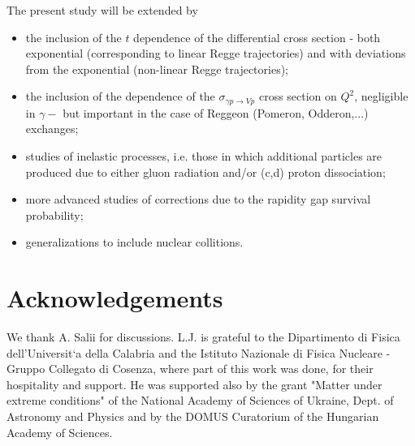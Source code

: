 \documentclass[12pt]{article}
\begin{document}
The present study will be extended by
\begin{itemize}
\item the inclusion of the $t$ dependence of the differential cross section - both exponential (corresponding to linear Regge trajectories) and with deviations from the exponential 
(non-linear Regge trajectories);
\item the inclusion of the dependence of the $\sigma_{\gamma p \rightarrow V p}$ cross section on $Q^2$, negligible in $\gamma-$ but important in the case of Reggeon (Pomeron, Odderon,...) exchanges;
\item studies of inelastic processes, i.e. those in which additional particles are produced due to either gluon radiation and/or (c,d) proton dissociation;
\item more advanced studies of corrections due to the rapidity gap survival probability;
\item generalizations to include nuclear collitions.
\end{itemize}


 \section*{Acknowledgements}
We thank A. Salii for discussions. L.J. is grateful to the Dipartimento di Fisica dell'Universit`a della Calabria and the Istituto Nazionale di Fisica Nucleare - Gruppo Collegato di Cosenza, where part of this work was done, for their hospitality and support. 
He was supported also by the grant "Matter under extreme conditions" of the
National Academy of Sciences of Ukraine, Dept. of Astronomy and
Physics and by the DOMUS Curatorium of the Hungarian Academy of Sciences.
\end{document}
